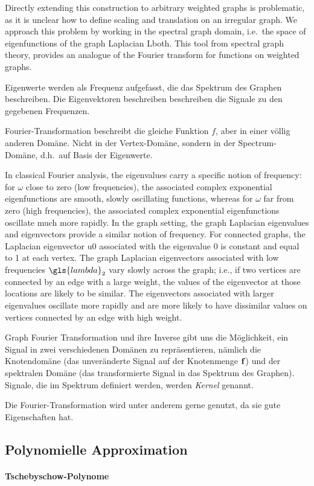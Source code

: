 Directly extending this construction to arbitrary weighted graphs is problematic, as it is unclear
how to define scaling and translation on an irregular graph.
We approach this problem by working in the spectral graph domain, i.e.\ the space of eigenfunctions of the graph Laplacian \gls{Lboth}.
This tool from spectral graph theory, provides an analogue of the Fourier transform for functions on weighted graphs.

Eigenwerte werden als Frequenz aufgefasst, die das Spektrum des Graphen beschreiben.
Die Eigenvektoren beschreiben beschreiben die Signale zu den gegebenen Frequenzen.

Fourier-Transformation beschreibt die gleiche Funktion $f$, aber in einer völlig anderen Domäne.
Nicht in der Vertex-Domäne, sondern in der Spectrum-Domäne, d.h.\ auf Basis der Eigenwerte.

In classical Fourier analysis, the eigenvalues carry a specific notion of frequency:
for $\omega$ close
to zero (low frequencies), the associated complex exponential
eigenfunctions are smooth, slowly oscillating functions,
whereas for $\omega$ far from zero (high frequencies), the associated
complex exponential eigenfunctions oscillate much more
rapidly. In the graph setting, the graph Laplacian eigenvalues
and eigenvectors provide a similar notion of frequency. For
connected graphs, the Laplacian eigenvector u0 associated
with the eigenvalue 0 is constant and equal to 1
at each
vertex. The graph Laplacian eigenvectors associated with low
frequencies $\gls{lambda}_2$ vary slowly across the graph; i.e., if two
vertices are connected by an edge with a large weight, the
values of the eigenvector at those locations are likely to be
similar. The eigenvectors associated with larger eigenvalues
oscillate more rapidly and are more likely to have dissimilar
values on vertices connected by an edge with high weight.

Graph Fourier Transformation und ihre Inverse gibt uns die Möglichkeit, ein Signal in zwei verschiedenen Domänen zu repräsentieren, nämlich die Knotendomäne (das unveränderte Signal auf der Knotenmenge $\mathbf{f}$) und der spektralen Domäne (das transformierte Signal in das Spektrum des Graphen).
Signale, die im Spektrum definiert werden, werden \emph{Kernel} genannt.

Die Fourier-Transformation wird unter anderem gerne genutzt, da sie gute Eigenschaften hat.

\subsection{Polynomielle Approximation}
\label{polynomielle_approximation}

\paragraph{Tschebyschow-Polynome}
\label{tschebyschow_polynome}
